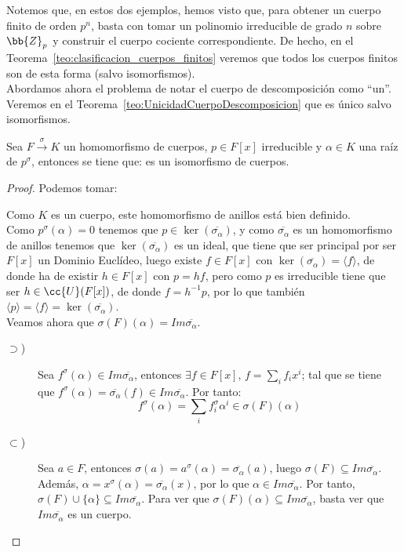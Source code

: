 Notemos que, en estos dos ejemplos, hemos visto que, para obtener un cuerpo finito de orden $p^n$, basta con tomar un polinomio irreducible de grado $n$ sobre $\bb{Z}_p$ y construir el cuerpo cociente correspondiente. De hecho, en el Teorema~\ref{teo:clasificacion_cuerpos_finitos} veremos que todos los cuerpos finitos son de esta forma (salvo isomorfismos).\\

Abordamos ahora el problema de notar el cuerpo de descomposición como ``un''. Veremos en el Teorema~\ref{teo:UnicidadCuerpoDescomposicion} que es único salvo isomorfismos.
\begin{lema}\label{lema:extension}
    Sea $F\stackrel{\sigma}{\to}{K}$ un homomorfismo de cuerpos, $p\in F[x]$ irreducible y $\alpha\in K$ una raíz de $p^\sigma$, entonces se tiene que:
    es un isomorfismo de cuerpos.
    \begin{proof}
        Podemos tomar:
        
        Como $K$ es un cuerpo, este homomorfismo de anillos está bien definido.\\

        Como $p^\sigma(\alpha) = 0$ tenemos que $p\in \ker(\overline{\sigma_\alpha})$, y como $\overline{\sigma_\alpha}$ es un homomorfismo de anillos tenemos que $\ker(\overline{\sigma_\alpha})$ es un ideal, que tiene que ser principal por ser $F[x]$ un Dominio Euclídeo, luego existe $f\in F[x]$ con $\ker(\overline{\sigma_\alpha}) = \langle f \rangle $, de donde ha de existir $h\in F[x]$ con $p = hf$, pero como $p$ es irreducible tiene que ser $h\in \cc{U}(F[x])$, de donde $f = h^{-1}p$, por lo que también $\langle p \rangle = \langle f \rangle =\ker(\overline{\sigma_\alpha})$.\\


        Veamos ahora que $\sigma(F)(\alpha)= Im\overline{\sigma_\alpha}$.
        \begin{description}
            \item[$\supset$)] Sea $f^\sigma(\alpha)\in Im\overline{\sigma_\alpha}$, entonces $\exists f\in F[x]$, $f=\sum\limits_i f_i x^i$; tal que se tiene que $f^\sigma(\alpha) = \overline{\sigma_\alpha}(f) \in Im\overline{\sigma_\alpha}$. Por tanto:
            \begin{equation*}
                f^\sigma(\alpha) = \sum_i f_i^\sigma \alpha^i \in \sigma(F)(\alpha)
            \end{equation*}
            \item[$\subset$)] Sea $a\in F$, entonces $\sigma(a) = a^\sigma(\alpha) = \overline{\sigma_\alpha}(a)$, luego $\sigma(F)\subseteq Im\overline{\sigma_\alpha}$. Además, $\alpha = x^\sigma(\alpha) = \overline{\sigma_\alpha}(x)$, por lo que $\alpha\in Im\overline{\sigma_\alpha}$. Por tanto, $\sigma(F)\cup \{\alpha\}\subseteq Im\overline{\sigma_\alpha}$. Para ver que $\sigma(F)(\alpha)\subseteq Im\overline{\sigma_\alpha}$, basta ver que $Im\overline{\sigma_\alpha}$ es un cuerpo.
            

\end{description}
\end{proof}
\end{lema}
